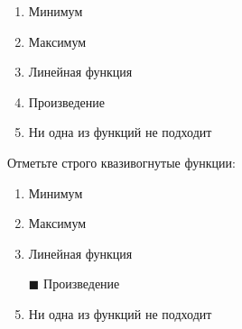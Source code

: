 \begin{enumerate}[label=$\square$]
	
	
	
	
	
	\item Минимум
	\item Максимум
	\item Линейная функция
	\item Произведение
	\item Ни одна из функций не подходит
\end{enumerate}

\task
Отметьте строго квазивогнутые функции:
\begin{enumerate}[label=$\square$] %
	\item Минимум
	\item Максимум
	\item Линейная функция
	\item[$\blacksquare$] Произведение
	\item Ни одна из функций не подходит
\end{enumerate}

